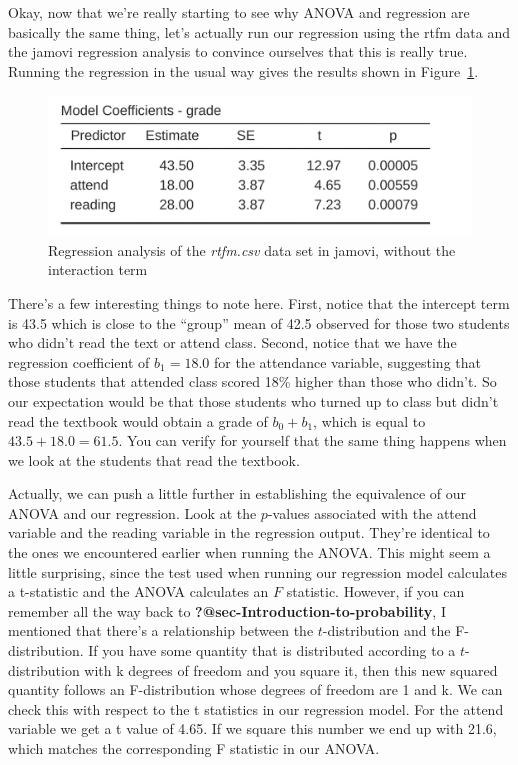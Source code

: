 \documentclass[
  a4paper,
]{book}
\begin{document}
Okay, now that we're really starting to see why ANOVA and regression are
basically the same thing, let's actually run our regression using the
rtfm data and the jamovi regression analysis to convince ourselves that
this is really true. Running the regression in the usual way gives the
results shown in Figure~\ref{fig-fig14-18}.

\begin{figure}

\includegraphics[width=1\textwidth,height=\textheight]{images/fig14-18.png} \hfill{}

\caption{\label{fig-fig14-18}Regression analysis of the \emph{rtfm.csv}
data set in jamovi, without the interaction term}

\end{figure}

There's a few interesting things to note here. First, notice that the
intercept term is 43.5 which is close to the ``group'' mean of 42.5
observed for those two students who didn't read the text or attend
class. Second, notice that we have the regression coefficient of
\(b_1 = 18.0\) for the attendance variable, suggesting that those
students that attended class scored 18\% higher than those who didn't.
So our expectation would be that those students who turned up to class
but didn't read the textbook would obtain a grade of \(b_0 + b_1\),
which is equal to \(43.5 + 18.0 = 61.5\). You can verify for yourself
that the same thing happens when we look at the students that read the
textbook.

Actually, we can push a little further in establishing the equivalence
of our ANOVA and our regression. Look at the \(p\)-values associated
with the attend variable and the reading variable in the regression
output. They're identical to the ones we encountered earlier when
running the ANOVA. This might seem a little surprising, since the test
used when running our regression model calculates a t-statistic and the
ANOVA calculates an \(F\) statistic. However, if you can remember all
the way back to \textbf{?@sec-Introduction-to-probability}, I mentioned
that there's a relationship between the \(t\)-distribution and the
F-distribution. If you have some quantity that is distributed according
to a \(t\)-distribution with k degrees of freedom and you square it,
then this new squared quantity follows an F-distribution whose degrees
of freedom are 1 and k. We can check this with respect to the t
statistics in our regression model. For the attend variable we get a t
value of 4.65. If we square this number we end up with 21.6, which
matches the corresponding F statistic in our ANOVA.
\end{document}
